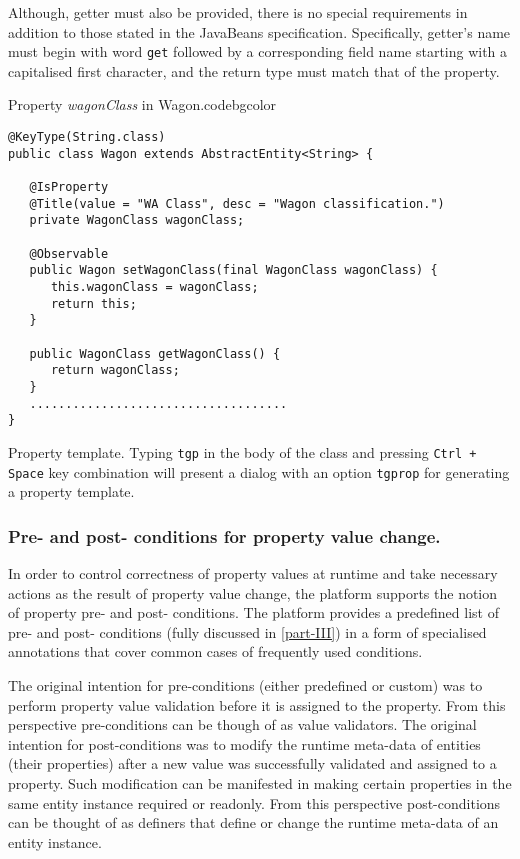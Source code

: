   Although, getter must also be provided, there is no special requirements in addition to those stated in the JavaBeans specification.
  Specifically, getter's name must begin with word \texttt{get} followed by a corresponding field name starting with a capitalised first character, and the return type must match that of the property.

  \begin{code}{Property \emph{wagonClass} in Wagon.}{\label{lst:WagonWagonClassProperty}}{codebgcolor}
    \begin{lstlisting}
@KeyType(String.class)
public class Wagon extends AbstractEntity<String> {

   @IsProperty
   @Title(value = "WA Class", desc = "Wagon classification.")
   private WagonClass wagonClass;

   @Observable
   public Wagon setWagonClass(final WagonClass wagonClass) {
      this.wagonClass = wagonClass;
      return this;
   }
  
   public WagonClass getWagonClass() {
      return wagonClass;
   }
   ....................................
}
    \end{lstlisting}
  \end{code}


  \begin{notebox}{Property template.}{\label{nb:EclipseTemplatesForProperty}}
    Typing \texttt{tgp} in the body of the class and pressing \texttt{Ctrl + Space} key combination will present a dialog with an option \texttt{tgprop} for generating a property template.
  \end{notebox}

  \subsubsection*{Pre- and post- conditions for property value change.}
  
  In order to control correctness of property values at runtime and take necessary actions as the result of property value change, the platform supports the notion of property pre- and post- conditions.
  The platform provides a predefined list of pre- and post- conditions (fully discussed in \ref{part-III}) in a form of specialised annotations that cover common cases of frequently used conditions.
  
  The original intention for pre-conditions (either predefined or custom) was to perform property value validation before it is assigned to the property.
  From this perspective pre-conditions can be though of as value validators.
  The original intention for post-conditions was to modify the runtime meta-data of entities (their properties) after a new value was successfully validated and assigned to a property.
  Such modification can be manifested in making certain properties in the same entity instance required or readonly.
  From this perspective post-conditions can be thought of as definers that define or change the runtime meta-data of an entity instance.
  
